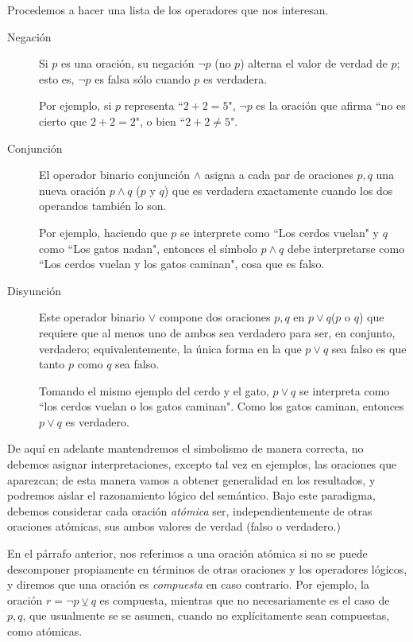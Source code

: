 \documentclass{book}
\begin{document}
Procedemos a hacer una lista de los operadores que nos interesan.
\begin{description}
	\item [Negación]
	Si $p$ es una oración, su negación $\neg p$ (no $p$) alterna el valor de verdad de $p$; esto es, $\neg p$ es falsa sólo cuando $p$ es verdadera.
	
	Por ejemplo, si $p$ representa ``$2+2=5$", $\neg p$ es la oración que afirma ``no es cierto que $2+2=2$", o bien ``$2+2\neq 5$".

	\item[Conjunción] El operador binario conjunción $\wedge$ asigna a cada par de oraciones $p,q$ una nueva oración $p \wedge q$ ($p$ y $q$) que es verdadera exactamente cuando los dos operandos también lo son.

	Por ejemplo, haciendo que $p$ se interprete como ``Los cerdos vuelan" y $q$ como ``Los gatos nadan", entonces el símbolo $p\wedge q$ debe interpretarse como ``Los cerdos vuelan y los gatos caminan", cosa que es falso.
	
	\item[Disyunción] Este operador binario $\vee$ compone dos oraciones $p,q$ en $p\vee q$($p$ o $q$) que requiere que al menos uno de ambos sea verdadero para ser, en conjunto, verdadero; equivalentemente, la única forma en la que $p \vee q$ sea falso es que tanto $p$ como $q$ sea falso.
	
	Tomando el mismo ejemplo del cerdo y el gato, $p\vee q$ se interpreta como ``los cerdos vuelan o los gatos caminan". Como los gatos caminan, entonces $p \vee q$ es verdadero.
\end{description}

De aquí en adelante mantendremos el simbolismo de manera correcta, no debemos asignar interpretaciones, excepto tal vez en ejemplos, las oraciones que aparezcan; de esta manera vamos a obtener generalidad en los resultados, y podremos aislar el razonamiento lógico del semántico.
Bajo este paradigma, debemos considerar cada oración \emph{atómica} ser, independientemente de otras oraciones atómicas, sus ambos valores de verdad (falso o verdadero.)

En el párrafo anterior, nos referimos a una oración atómica si no se puede descomponer propiamente en términos de otras oraciones y los operadores lógicos, y diremos que una oración es \emph{compuesta} en caso contrario.
Por ejemplo, la oración $r = \neg p \veebar q$ es compuesta, mientras que no necesariamente es el caso de $p,q$, que usualmente se se asumen, cuando no explícitamente sean compuestas, como atómicas.
\end{document}
